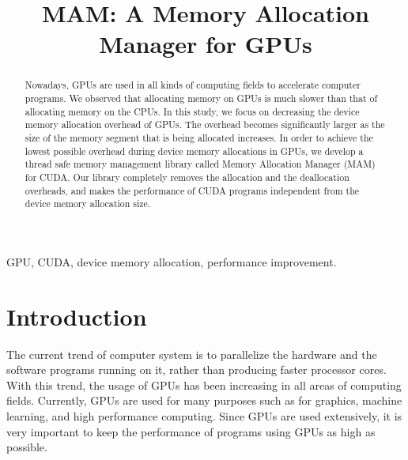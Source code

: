 \documentclass[conference]{IEEEtran}
\begin{document}
\title{MAM: A Memory Allocation Manager for GPUs}

\author{
	\and
}


\maketitle

\begin{abstract}
Nowadays, GPUs are used in all kinds of computing fields to accelerate computer programs. We observed that allocating memory on GPUs is much slower than that of allocating memory on the CPUs. In this study, we focus on decreasing the device memory allocation overhead of GPUs. The overhead becomes significantly larger as the size of the memory segment that is being allocated increases.  In order to achieve the lowest possible overhead during device memory allocations in GPUs, we develop a thread safe memory management library called Memory Allocation Manager (MAM) for CUDA. Our library  completely removes the allocation and the deallocation overheads, and makes the performance of CUDA programs independent from the device memory allocation size.
\end{abstract}

\begin{IEEEkeywords}
GPU, CUDA, device memory allocation, performance improvement.
\end{IEEEkeywords}


\IEEEpeerreviewmaketitle



\section{Introduction}
The current trend of computer system is to parallelize the hardware and the software programs running on it, rather than producing faster processor cores. With this trend, the usage of GPUs has been increasing in all areas of computing fields. Currently, GPUs are used for many purposes such as for graphics, machine learning, and high performance computing. Since GPUs are used extensively, it is very important to keep the performance of programs using GPUs as high as possible.
\end{document}
